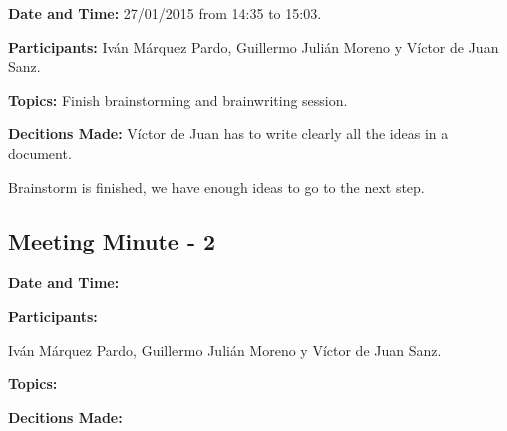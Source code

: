 \documentclass{report}
\begin{document}
\textbf{Date and Time:} 27/01/2015 from 14:35 to 15:03.


\textbf{Participants: } Iván Márquez Pardo, Guillermo Julián Moreno y Víctor de Juan Sanz.


\textbf{Topics: }
Finish brainstorming and brainwriting session.


\textbf{Decitions Made: }
Víctor de Juan has to write clearly all the ideas in a document.

Brainstorm is finished, we have enough ideas to go to the next step.

\subsection{Meeting Minute - 2}


\textbf{Date and Time:}


\textbf{Participants: }

Iván Márquez Pardo, Guillermo Julián Moreno y Víctor de Juan Sanz.


\textbf{Topics: }


\textbf{Decitions Made: }
\end{document}
